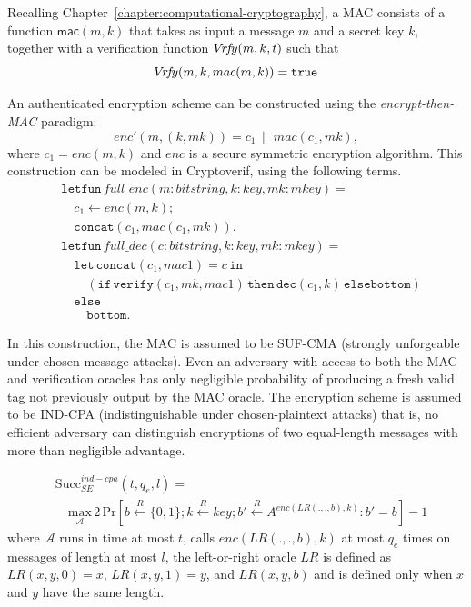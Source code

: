 Recalling Chapter~\ref{chapter:computational-cryptography}, a MAC consists of a function $\mathsf{mac}(m,k)$ that takes as input a message $m$ and a secret key $k$, together with a verification function $V\!r\!f\!y(m,k,t)$ such that 
\[
V\!r\!f\!y(m, k, mac(m, k)) = \mathtt{true}
\]

An authenticated encryption scheme can be constructed using the \emph{encrypt-then-MAC} paradigm:
\[
enc'(m,(k,mk)) = c_1 \,\|\, mac(c_1,mk),
\]
where $c_1 = enc(m,k)$ and $enc$ is a secure symmetric encryption algorithm. This construction can be modeled in Cryptoverif, using the following terms.
\begin{align*}
&\mathbf{\mathtt{letfun}}\,full\_enc(m: bitstring, k: key, mk : mkey ) = \\
&\quad c_1 \leftarrow enc(m, k); \\
&\quad \mathtt{concat}(c_1 , mac(c_1 , mk)). \\[2ex]
&\mathbf{\mathtt{letfun}}\,full\_dec(c: bitstring, k: key, mk : mkey ) = \\
&\quad \mathbf{\mathtt{let}}\,\mathtt{concat}(c_1, mac1) = c \,\mathbf{\mathtt{in}} \\
&\qquad(\mathbf{\mathtt{if}}\,\mathtt{verify}(c_1, mk, mac1)\, \mathbf{\mathtt{then}}\, \mathtt{dec}(c_1, k)\,\mathbf{\mathtt{else}} \mathtt{bottom}) \\
&\quad\mathbf{\mathtt{else}} \\
&\qquad\mathtt{bottom}.
\end{align*}

In this construction, the MAC is assumed to be SUF-CMA (strongly unforgeable under chosen-message attacks). Even an adversary with access to both the MAC and verification oracles has only negligible probability of producing a fresh valid tag not previously output by the MAC oracle. The encryption scheme is assumed to be IND-CPA (indistinguishable under chosen-plaintext attacks) that is, no efficient adversary can distinguish encryptions of two equal-length messages with more than negligible advantage.

\begin{definition}
\begin{align*}
&\mathrm{Succ}^{ind-cpa}_{SE}(t, q_e, l) = \\
&\quad\underset{\mathcal{A}}{\mathrm{max}}\,2\,\mathrm{Pr}\left[b \xleftarrow{R} \{0, 1\}; k \xleftarrow{R} key; b' \xleftarrow{R} A^{enc(LR(.,.,b),k)}: b' = b \right] 
- 1
\end{align*}
where $\mathcal{A}$ runs in time at most $t$, calls $enc(LR(., ., b), k)$ at most $q_e$ times on messages of length at most $l$, the left-or-right oracle $LR$ is defined as $LR(x, y , 0) = x$, $LR(x, y , 1) = y$, and $LR(x, y , b)$ and is defined only when $x$ and $y$ have the same length.
\end{definition}

